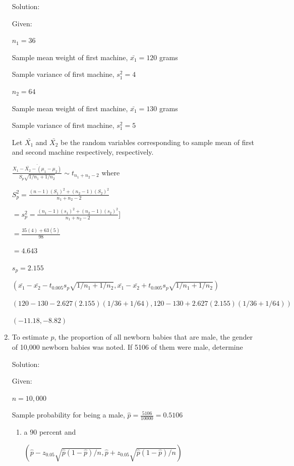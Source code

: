 \documentclass{article}
\begin{document}
\begin{enumerate}
    Solution:

    Given:

    $n_1=36$

    Sample mean weight of first machine, $\bar{x_1} = 120$ grams
    
    Sample variance of first machine, $s_1^2 = 4$

    $n_2=64$

    Sample mean weight of first machine, $\bar{x_1} = 130$ grams
    
    Sample variance of first machine, $s_1^2 = 5$
    
    Let $\bar{X_1}$ and $\bar{X_2}$ be the random variables corresponding to sample mean of first and second machine respectively, respectively.

    $\displaystyle \frac{\bar{X_1 - \bar{X_2} - \left(\mu_1 - \mu_2\right)}}{S_p\sqrt{1/n_1 + 1/n_2}} \sim t_{n_1+n_2-2}$ where

    $\displaystyle S_p^2 = \frac{(n-1)(S_1)^2+(n_2-1)(S_2)^2}{n_1+n_2-2}$

    $= \displaystyle s_p^2=\frac{(n_1-1)(s_1)^2+(n_2-1)(s_2)^2}{n_1+n_2-2}$]
    
    $= \displaystyle \frac{35(4)+ 63(5)}{98}$

    $= 4.643$

    $s_p = 2.155$

    $\left(\bar{x_1} - \bar{x_2} - t_{0.005}s_p{\sqrt{1/n_1+1/n_2}}, \bar{x_1} - \bar{x_2} + t_{0.005}s_p{\sqrt{1/n_1+1/n_2}}\right)$

    $\left(120 - 130 - 2.627(2.155){(1/36+1/64)}, 120 - 130 + 2.627(2.155){(1/36+1/64)}\right)$

    $\left(-11.18, -8.82\right)$

    \item  To estimate $p$, the proportion of all newborn babies that are male, the gender of 10,000 newborn babies was noted. If 5106 of them were male, determine
   
    Solution:

    Given:

    $n=10,000$

    Sample probability for being a male, $\displaystyle \hat{p}=\frac{5106}{10000} = 0.5106$
    \begin{enumerate}
        \item a 90 percent and
        
        $(\hat{p} - z_{0.05}\sqrt{\hat{p}(1-\hat{p})/n}, \hat{p} + z_{0.05}\sqrt{\hat{p}(1-\hat{p})/n})$\


\end{enumerate}
\end{enumerate}
\end{document}
